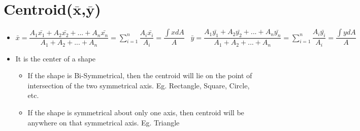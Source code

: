 \documentclass[8pt]{report}
\begin{document}
	\section{Centroid($\bm{\bar{x}}$,$\bm{\bar{y}}$)}
		\begin{itemize}
			\item $\boxed{\bar{x} = \dfrac{A_1\bar{x_1}+A_2\bar{x_2}+...+A_n\bar{x_n}}{A_1+A_2+...+A_n} = \sum_{i=1}^{n}\dfrac{A_i\bar{x_i}}{A_i} =\dfrac{\int xdA}{A}}\;\;\;\boxed{\bar{y}=\dfrac{A_1\bar{y_1}+A_2\bar{y_2}+...+A_n\bar{y_n}}{A_1+A_2+...+A_n} = \sum_{i=1}^{n}\dfrac{A_i\bar{y_i}}{A_i} =\dfrac{\int ydA}{A}}$
			\item It is the center of a shape
				\begin{itemize}
					\item If the shape is Bi-Symmetrical, then the centroid will lie on the point of intersection of the two symmetrical axis. Eg. Rectangle, Square, Circle, etc.
					\item If the shape is symmetrical about only one axis, then centroid will be anywhere on that symmetrical axis. Eg. Triangle
				\end{itemize}
		\end{itemize}\hrulefill
\end{document}
